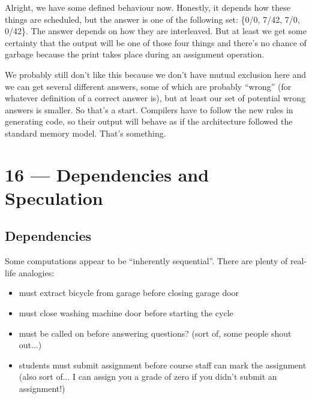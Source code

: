 \documentclass[a4paper]{report}
\begin{document}
Alright, we have some defined behaviour now.  Honestly, it depends how these things are scheduled, but the answer is one of the following set: \{0/0, 7/42, 7/0,  0/42\}. The answer depends on how they are interleaved. But at least we get some certainty that the output will be one of those four things and there's no chance of garbage because the print takes place during an assignment operation. 

We probably still don't like this because we don't have mutual exclusion here and we can get several different answers, some of which are probably ``wrong'' (for whatever definition of a correct answer is), but at least our set of potential wrong answers is smaller. So that's a start. Compilers have to follow the new rules in generating code, so their output will behave as if the architecture followed the standard memory model. That's something. 










\chapter*{16 --- Dependencies and Speculation}


\section*{Dependencies}
Some computations appear to be ``inherently sequential''. There are plenty of real-life analogies:

\begin{itemize}
\item must extract bicycle from garage before closing garage door
 
\item must close washing machine door before starting the cycle
 
\item must be called on before answering questions? (sort of, some people shout out...)
 
\item students must submit assignment before course staff can mark the assignment (also sort of... I can assign you a grade of zero if you didn't submit an assignment!)
\end{itemize}
\end{document}
